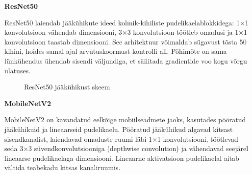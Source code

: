 \textbf{ResNet50}

ResNet50 laiendab jääkühikute ideed kolmik-kihiliste pudelikaelablokkidega: 1×1 konvolutsioon vähendab dimensiooni, 3×3 konvolutsioon töötleb omadusi ja 1×1 konvolutsioon taastab dimensiooni. See arhitektuur võimaldab sügavust tõsta 50 kihini, hoides samal ajal arvutuskoormust kontrolli all. Põhimõte on sama – lünkühendus ühendab sisendi väljundiga, et säilitada gradientide voo kogu võrgu ulatuses.

\begin{figure}[H]
    \centering
    \caption{ResNet50 jääkühikust skeem}
    \label{fig:ResNet50jääkühikust}
\end{figure}

\textbf{MobileNetV2}

MobileNetV2 on kavandatud eelkõige mobiilseadmete jaoks, kasutades pööratud jääkühikuid ja lineaarseid pudelikaelu. Pööratud jääkühikud algavad kitsast sisendkanalist, laiendavad omaduste ruumi läbi 1×1 konvolutsiooni, töötlevad seda 3×3 süvendkonvolutsiooniga (depthwise convolution) ja vähendavad seejärel lineaarse pudelikaelaga dimensiooni. Lineaarne aktivatsioon pudelikaelal aitab vältida teabekadu kitsas kanaliruumis.


